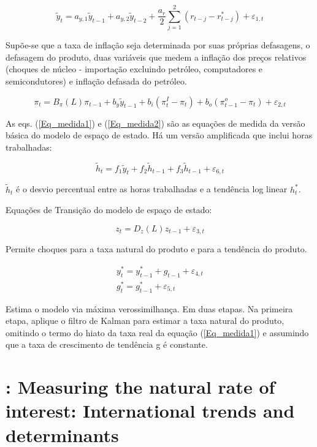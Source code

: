 \documentclass[11pt,oneside,a4paper]{article}
\begin{document}
\begin{equation} \label{Eq_medida1}
    \tilde{y}_t = a_{y,1}\tilde{y}_{t-1} + a_{y,2}\tilde{y}_{t-2} + \dfrac{a_r}{2}\sum_{j=1}^{2} (r_{t-j} - r_{t-j}^{*}) + \varepsilon_{1,t}
\end{equation}

Supõe-se que a taxa de inflação seja determinada por suas próprias defasagens, o defasagem do produto, duas variáveis que medem a inflação dos preços relativos (choques de núcleo - importação excluindo petróleo, computadores e semicondutores) e inflação defasada do petróleo.

\begin{equation} \label{Eq_medida2}
    \pi_t = B_{\pi}(L)\pi_{t-1} + b_y \tilde{y}_{t-1} + b_i(\pi_t^{I} - \pi_t ) + b_{o}(\pi_{t-1}^{o} - \pi_t) + \varepsilon_{2,t}
\end{equation}

As eqs. (\ref{Eq_medida1}) e (\ref{Eq_medida2}) são as equações de medida da versão básica do modelo de espaço de estado. Há um versão amplificada que inclui horas trabalhadas:

\begin{equation}
    \tilde{h}_t = f_1\tilde{y}_t + f_2\tilde{h}_{t-1} + f_3\tilde{h}_{t-1} + \varepsilon_{6,t}
\end{equation}

$\tilde{h}_t$ é o desvio percentual entre as horas trabalhadas e a tendência log linear $h_t^{*}$.

Equações de Transição do modelo de espaço de estado:

\begin{equation}
    z_t = D_z(L)z_{t-1} + \varepsilon_{3,t}
\end{equation}

Permite choques para a taxa natural do produto e para a tendência do produto.

\begin{eqnarray}
    y_t^{*} = y_{t-1}^{*} + g_{t-1} + \varepsilon_{4,t} \\
    g_t^{*} = g_{t-1}^{*} + \varepsilon_{5,t}
\end{eqnarray}

Estima o modelo via máxima verossimilhança. Em duas etapas. Na primeira etapa, aplique o filtro de Kalman para estimar a taxa natural do produto, omitindo o termo do hiato da taxa real da equação (\ref{Eq_medida1}) e assumindo que a taxa de crescimento de tendência g é constante.
%
%
\section{\citet{HLW:2017}: Measuring the natural rate of interest: International trends and determinants}
\end{document}
